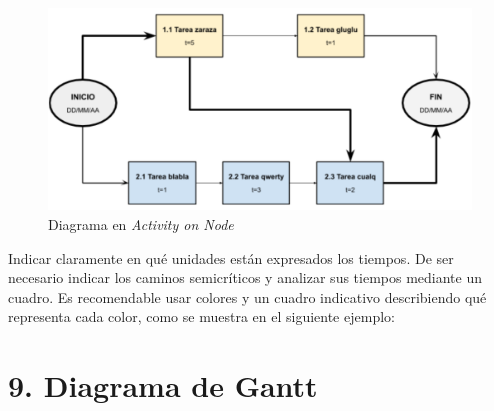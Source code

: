 \documentclass[
11pt, %
codirector, %
]{charter}
\begin{document}
\begin{figure}[htpb]
\centering 
\includegraphics[width=.8\textwidth]{./Figuras/AoN.png}
\caption{Diagrama en \textit{Activity on Node}}
\label{fig:AoN}
\end{figure}

Indicar claramente en qué unidades están expresados los tiempos.
De ser necesario indicar los caminos semicríticos y analizar sus tiempos mediante un cuadro.
Es recomendable usar colores y un cuadro indicativo describiendo qué representa cada color, como se muestra en el siguiente ejemplo:



\section{9. Diagrama de Gantt}
\label{sec:gantt}
\end{document}
